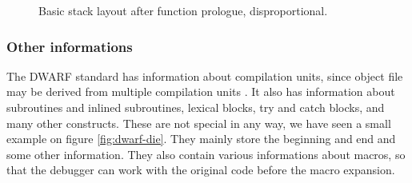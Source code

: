 \begin{figure}
    \caption{Basic stack layout after function prologue, disproportional.}
    \label{fig:stack-layout}
\end{figure}

\subsubsection{Other informations}
The DWARF standard has information about compilation units, since object file
may be derived from multiple compilation units \cite{dwarf}. It also has
information about subroutines and inlined subroutines, lexical blocks, try and
catch blocks, and many other constructs. These are not special in any way, we
have seen a small example on figure \ref{fig:dwarf-die}. They mainly store the
beginning and end and some other information. They also contain various
informations about macros, so that the debugger can work with the original code
before the macro expansion.

